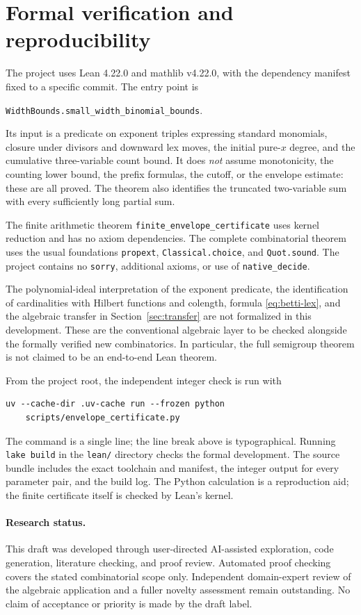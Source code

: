 \documentclass[11pt,a4paper]{article}
\begin{document}
\section{Formal verification and reproducibility}\label{sec:formal}
The project uses Lean 4.22.0 and mathlib v4.22.0, with the dependency manifest fixed to a specific commit. The entry point is
\begin{center}
\texttt{WidthBounds.small\_width\_binomial\_bounds}.
\end{center}
Its input is a predicate on exponent triples expressing standard monomials, closure under divisors and downward lex moves, the initial pure-$x$ degree, and the cumulative three-variable count bound. It does \emph{not} assume monotonicity, the counting lower bound, the prefix formulas, the cutoff, or the envelope estimate: these are all proved. The theorem also identifies the truncated two-variable sum with every sufficiently long partial sum.

The finite arithmetic theorem \texttt{finite\_envelope\_certificate} uses kernel reduction and has no axiom dependencies. The complete combinatorial theorem uses the usual foundations \texttt{propext}, \texttt{Classical.choice}, and \texttt{Quot.sound}. The project contains no \texttt{sorry}, additional axioms, or use of \texttt{native\_decide}.

The polynomial-ideal interpretation of the exponent predicate, the identification of cardinalities with Hilbert functions and colength, formula \eqref{eq:betti-lex}, and the algebraic transfer in Section~\ref{sec:transfer} are not formalized in this development. These are the conventional algebraic layer to be checked alongside the formally verified new combinatorics. In particular, the full semigroup theorem is not claimed to be an end-to-end Lean theorem.

From the project root, the independent integer check is run with
\begin{verbatim}
uv --cache-dir .uv-cache run --frozen python 
    scripts/envelope_certificate.py
\end{verbatim}
The command is a single line; the line break above is typographical. Running \texttt{lake build} in the \texttt{lean/} directory checks the formal development. The source bundle includes the exact toolchain and manifest, the integer output for every parameter pair, and the build log. The Python calculation is a reproduction aid; the finite certificate itself is checked by Lean's kernel.

\paragraph{Research status.}
This draft was developed through user-directed AI-assisted exploration, code generation, literature checking, and proof review. Automated proof checking covers the stated combinatorial scope only. Independent domain-expert review of the algebraic application and a fuller novelty assessment remain outstanding. No claim of acceptance or priority is made by the draft label.
\end{document}
